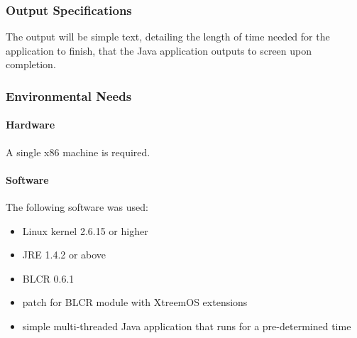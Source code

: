 \subsubsection{Output Specifications}
The output will be simple text, detailing the length of time needed for the application to finish, that the Java application outputs to screen upon completion.

\subsubsection{Environmental Needs}

\paragraph{Hardware}
A single x86 machine is required.

\paragraph{Software}
The following software was used:
\begin{itemize}
\item Linux kernel 2.6.15 or higher
\item JRE 1.4.2 or above
\item BLCR 0.6.1 
\item patch for BLCR module with XtreemOS extensions
\item simple multi-threaded Java application that runs for a pre-determined time
\end{itemize}
